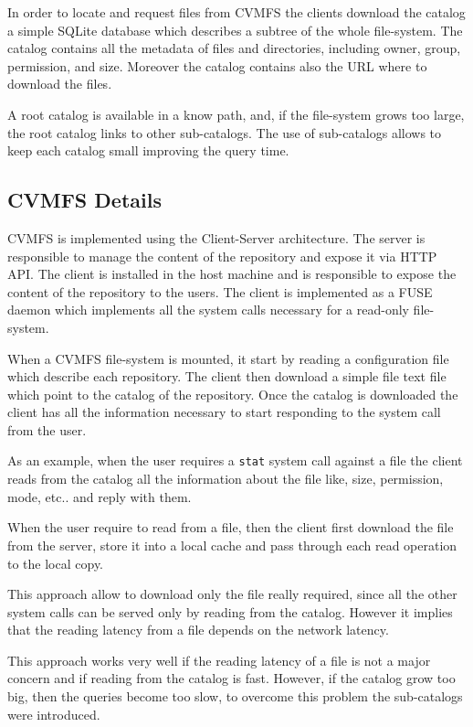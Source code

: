 In order to locate and request files from CVMFS the clients download the
catalog a simple SQLite database which describes a subtree of the whole
file-system.  The catalog contains all the metadata of files and directories,
including owner, group, permission, and size. Moreover the catalog contains
also the URL where to download the files.

A root catalog is available in a know path, and, if the file-system grows too
large, the root catalog links to other sub-catalogs. The use of sub-catalogs
allows to keep each catalog small improving the query time.

\subsection{CVMFS Details}

CVMFS is implemented using the Client-Server architecture. The server is
responsible to manage the content of the repository and expose it via HTTP API.
The client is installed in the host machine and is responsible to expose the
content of the repository to the users. The client is implemented as a FUSE
daemon which implements all the system calls necessary for a read-only
file-system. 

When a CVMFS file-system is mounted, it start by reading a configuration file
which describe each repository. The client then download a simple file text
file which point to the catalog of the repository. Once the catalog is
downloaded the client has all the information necessary to start responding to
the system call from the user.

As an example, when the user requires a \texttt{stat} system call against a
file the client reads from the catalog all the information about the file like,
size, permission, mode, etc.. and reply    with them.

When the user require to read from a file, then the client first download the
file from the server, store it into a local cache and pass through each read
operation to the local copy.

This approach allow to download only the file really required, since all the
other system calls can be served only by reading from the catalog. However it
implies that the reading latency from a file depends on the network latency.

This approach works very well if the reading latency of a file is not a major
concern and if reading from the catalog is fast. However, if the catalog grow
too big, then the queries become too slow, to overcome this problem the
sub-catalogs were introduced.

